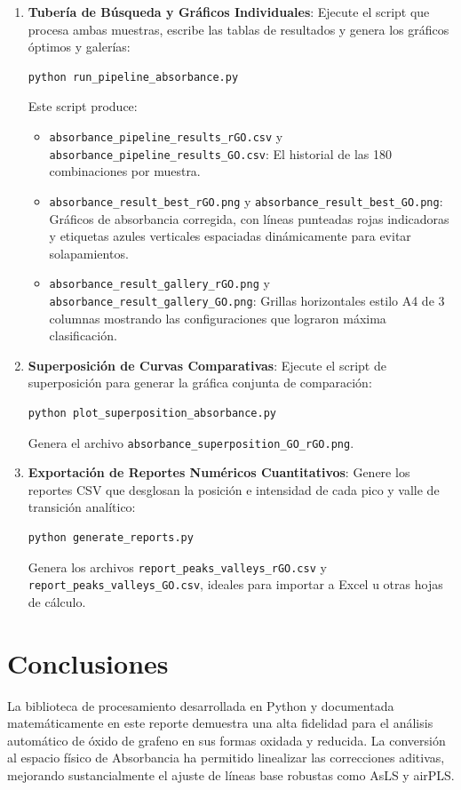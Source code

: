 \documentclass[a4paper,11pt]{article}
\begin{document}
\begin{enumerate}
    \item \textbf{Tubería de Búsqueda y Gráficos Individuales}:
    Ejecute el script que procesa ambas muestras, escribe las tablas de resultados y genera los gráficos óptimos y galerías:
    \begin{lstlisting}[language=bash]
    python run_pipeline_absorbance.py
    \end{lstlisting}
    Este script produce:
    \begin{itemize}
        \item \texttt{absorbance\_pipeline\_results\_rGO.csv} y \texttt{absorbance\_pipeline\_results\_GO.csv}: El historial de las 180 combinaciones por muestra.
        \item \texttt{absorbance\_result\_best\_rGO.png} y \texttt{absorbance\_result\_best\_GO.png}: Gráficos de absorbancia corregida, con líneas punteadas rojas indicadoras y etiquetas azules verticales espaciadas dinámicamente para evitar solapamientos.
        \item \texttt{absorbance\_result\_gallery\_rGO.png} y \texttt{absorbance\_result\_gallery\_GO.png}: Grillas horizontales estilo A4 de 3 columnas mostrando las configuraciones que lograron máxima clasificación.
    \end{itemize}

    \item \textbf{Superposición de Curvas Comparativas}:
    Ejecute el script de superposición para generar la gráfica conjunta de comparación:
    \begin{lstlisting}[language=bash]
    python plot_superposition_absorbance.py
    \end{lstlisting}
    Genera el archivo \texttt{absorbance\_superposition\_GO\_rGO.png}.

    \item \textbf{Exportación de Reportes Numéricos Cuantitativos}:
    Genere los reportes CSV que desglosan la posición e intensidad de cada pico y valle de transición analítico:
    \begin{lstlisting}[language=bash]
    python generate_reports.py
    \end{lstlisting}
    Genera los archivos \texttt{report\_peaks\_valleys\_rGO.csv} y \texttt{report\_peaks\_valleys\_GO.csv}, ideales para importar a Excel u otras hojas de cálculo.
\end{enumerate}

\section{Conclusiones}
La biblioteca de procesamiento desarrollada en Python y documentada matemáticamente en este reporte demuestra una alta fidelidad para el análisis automático de óxido de grafeno en sus formas oxidada y reducida. La conversión al espacio físico de Absorbancia ha permitido linealizar las correcciones aditivas, mejorando sustancialmente el ajuste de líneas base robustas como AsLS y airPLS.
\end{document}
